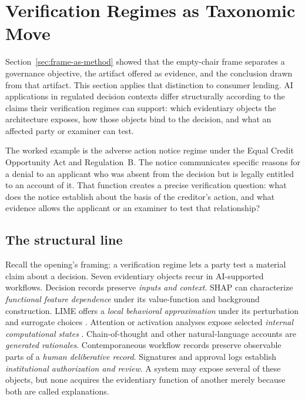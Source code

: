 
\section{Verification Regimes as Taxonomic Move}
\label{sec:verification-regimes}

Section~\ref{sec:frame-as-method} showed that the empty-chair frame separates a governance objective, the artifact offered as evidence, and the conclusion drawn from that artifact. This section applies that distinction to consumer lending. AI applications in regulated decision contexts differ structurally according to the claims their verification regimes can support: which evidentiary objects the architecture exposes, how those objects bind to the decision, and what an affected party or examiner can test.

The worked example is the adverse action notice regime under the Equal Credit Opportunity Act and Regulation~B. The notice communicates specific reasons for a denial to an applicant who was absent from the decision but is legally entitled to an account of it. That function creates a precise verification question: what does the notice establish about the basis of the creditor's action, and what evidence allows the applicant or an examiner to test that relationship?

\subsection{The structural line}
\label{sec:verification-regimes:structural-line}

Recall the opening's framing: a verification regime lets a party test a material claim about a decision. Seven evidentiary objects recur in AI-supported workflows. Decision records preserve \emph{inputs and context}. SHAP can characterize \emph{functional feature dependence} under its value-function and background construction. LIME offers a \emph{local behavioral approximation} under its perturbation and surrogate choices \parencite{lundberg2017,ribeiro2016}. Attention or activation analyses expose selected \emph{internal computational states} \parencite{jain2019}. Chain-of-thought and other natural-language accounts are \emph{generated rationales}. Contemporaneous workflow records preserve observable parts of a \emph{human deliberative record}. Signatures and approval logs establish \emph{institutional authorization and review}. A system may expose several of these objects, but none acquires the evidentiary function of another merely because both are called explanations.


